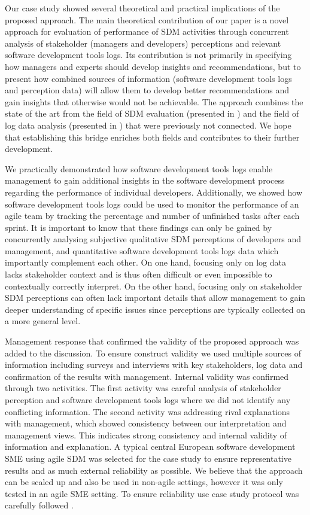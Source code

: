 Our case study showed several theoretical and practical implications of the proposed approach. The main theoretical contribution of our paper is a novel approach for evaluation of performance of SDM activities through concurrent analysis of stakeholder (managers and developers) perceptions and relevant software development tools logs. Its contribution is not primarily in specifying how managers and experts should develop insights and recommendations, but to present how combined sources of information (software development tools logs and perception data) will allow them to develop better recommendations and gain insights that otherwise would not be achievable. The approach combines the state of the art from the field of SDM evaluation (presented in ) and the field of log data analysis (presented in ) that were previously not connected. We hope that establishing this bridge enriches both fields and contributes to their further development.

We practically demonstrated how software development tools logs enable management to gain additional insights in the software development process regarding the performance of individual developers. Additionally, we showed how software development tools logs could be used to monitor the performance of an agile team by tracking the percentage and number of unfinished tasks after each sprint. It is important to know that these findings can only be gained by concurrently analysing subjective qualitative SDM perceptions of developers and management, and quantitative software development tools logs data which importantly complement each other. On one hand, focusing only on log data lacks stakeholder context and is thus often difficult or even impossible to contextually correctly interpret. On the other hand, focusing only on stakeholder SDM perceptions can often lack important details that allow management to gain deeper understanding of specific issues since perceptions are typically collected on a more general level. 

Management response that confirmed the validity of the proposed approach was added to the discussion. To ensure construct validity we used multiple sources of information including surveys and interviews with key stakeholders, log data and confirmation of the results with management. Internal validity was confirmed through two activities. The first activity was careful analysis of stakeholder perception and software development tools logs where we did not identify any conflicting information. The second activity was addressing rival explanations with management, which showed consistency between our interpretation and management views.  This indicates strong consistency and internal validity of information and explanation.  A typical central European software development SME using agile SDM was selected for the case study to ensure representative results and as much external reliability as possible. We believe that the approach can be scaled up and also be used in non-agile settings, however it was only tested in an agile SME setting. To ensure reliability use case study protocol was carefully followed \citep{yin2009case}.	


